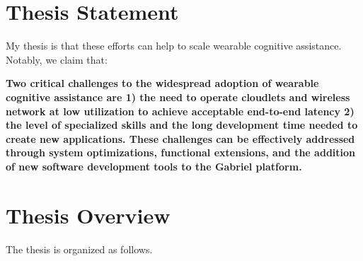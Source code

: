 \section{Thesis Statement}

My thesis is that these efforts can help to scale wearable cognitive assistance.
Notably, we claim that:

\textbf{Two critical challenges to the widespread adoption of wearable cognitive
  assistance are 1) the need to operate cloudlets and wireless network at low
  utilization to achieve acceptable end-to-end latency 2) the level of specialized
  skills and the long development time needed to create new applications. These
  challenges can be effectively addressed through system optimizations,
  functional extensions, and the addition of new software development tools to
  the Gabriel platform.}

\section{Thesis Overview}

The thesis is organized as follows.





